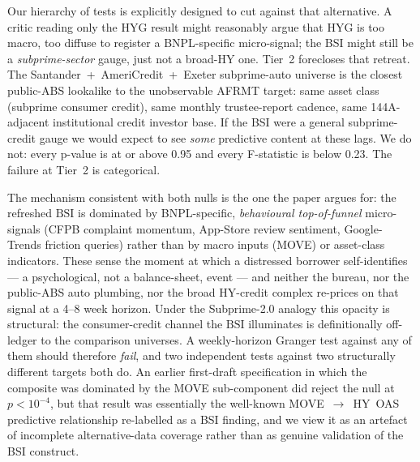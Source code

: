 \documentclass[11pt,letterpaper]{article}
\newcommand{\bsi}{\text{BSI}}
\begin{document}
Our hierarchy of tests is explicitly designed to cut against that
alternative. A critic reading only the HYG result might reasonably
argue that HYG is too macro, too diffuse to register a
BNPL-specific micro-signal; the BSI might still be a
\emph{subprime-sector} gauge, just not a broad-HY one. Tier~2
forecloses that retreat. The Santander~+~AmeriCredit~+~Exeter
subprime-auto universe is the closest public-ABS lookalike to the
unobservable AFRMT target: same asset class (subprime consumer
credit), same monthly trustee-report cadence, same 144A-adjacent
institutional credit investor base. If the BSI were a general
subprime-credit gauge we would expect to see \emph{some} predictive
content at these lags. We do not: every p-value is at or above 0.95
and every F-statistic is below 0.23. The failure at Tier~2 is
categorical.

The mechanism consistent with both nulls is the one the paper
argues for: the refreshed $\bsi$ is dominated by BNPL-specific,
\emph{behavioural top-of-funnel} micro-signals (CFPB complaint
momentum, App-Store review sentiment, Google-Trends friction
queries) rather than by macro inputs (MOVE) or asset-class
indicators. These sense the moment at which a distressed borrower
self-identifies --- a psychological, not a balance-sheet, event
--- and neither the bureau, nor the public-ABS auto plumbing, nor
the broad HY-credit complex re-prices on that signal at a 4--8
week horizon. Under the Subprime-2.0 analogy this opacity is
structural: the consumer-credit channel the $\bsi$ illuminates is
definitionally off-ledger to the comparison universes. A
weekly-horizon Granger test against any of them should therefore
\emph{fail}, and two independent tests against two structurally
different targets both do. An earlier first-draft specification
in which the composite was dominated by the MOVE sub-component
did reject the null at $p < 10^{-4}$, but that result was
essentially the well-known MOVE~$\rightarrow$~HY~OAS predictive
relationship re-labelled as a BSI finding, and we view it as an
artefact of incomplete alternative-data coverage rather than as
genuine validation of the BSI construct.
\end{document}
